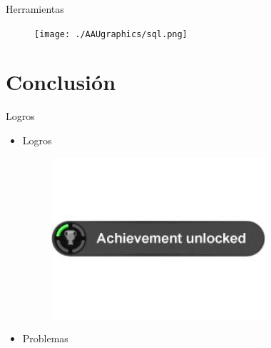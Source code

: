 \documentclass[10pt]{beamer}
\begin{document}
%
%
%



\begin{frame}{Herramientas}
\begin{block}{}

\begin{figure}[!h]
\centering
\texttt{[image: ./AAUgraphics/sql.png]}
\end{figure}
	
\end{block}
\end{frame}


\section{Conclusión}
\begin{frame}{Logros}
\begin{block}{}
\begin{itemize}
         \item Logros
         
		\begin{figure}[!h]
		\begin{center}
		\includegraphics[width=.4\textwidth]{./AAUgraphics/logro.jpg}
		\end{center}
		\end{figure}         
         
         
         \item Problemas

\end{itemize}




\end{block}
\end{frame}
\end{document}
